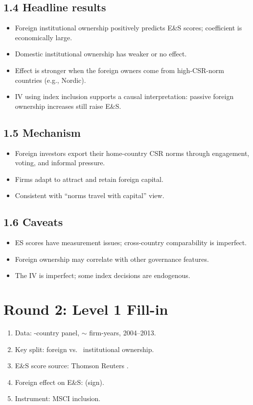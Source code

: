 \documentclass[11pt]{article}
\newcommand{\blank}[1]{\underline{\hspace{#1}}}
\begin{document}
\subsection*{1.4 Headline results}
\begin{itemize}
\item Foreign institutional ownership positively predicts E\&S scores; coefficient is economically large.
\item Domestic institutional ownership has weaker or no effect.
\item Effect is stronger when the foreign owners come from high-CSR-norm countries (e.g., Nordic).
\item IV using index inclusion supports a causal interpretation: passive foreign ownership increases still raise E\&S.
\end{itemize}

\subsection*{1.5 Mechanism}
\begin{itemize}
\item Foreign investors export their home-country CSR norms through engagement, voting, and informal pressure.
\item Firms adapt to attract and retain foreign capital.
\item Consistent with ``norms travel with capital'' view.
\end{itemize}

\subsection*{1.6 Caveats}
\begin{alertbox}
\begin{itemize}
\item ES scores have measurement issues; cross-country comparability is imperfect.
\item Foreign ownership may correlate with other governance features.
\item The IV is imperfect; some index decisions are endogenous.
\end{itemize}
\end{alertbox}

\section*{Round 2: Level 1 Fill-in}
\begin{enumerate}
\item Data: \blank{1cm}-country panel, $\sim$\blank{1cm} firm-years, 2004--2013.
\item Key split: foreign vs.\ \blank{1cm} institutional ownership.
\item E\&S score source: Thomson Reuters \blank{1.5cm}.
\item Foreign effect on E\&S: \blank{1cm} (sign).
\item Instrument: MSCI \blank{1.5cm} inclusion.
\end{enumerate}
\end{document}
